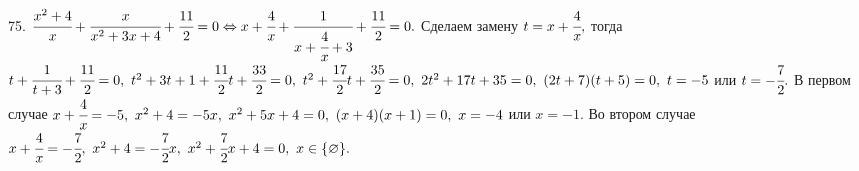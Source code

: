 75. $\cfrac{x^2+4}{x}+\cfrac{x}{x^2+3x+4}+\cfrac{11}{2}=0\Leftrightarrow x+\cfrac{4}{x}+\cfrac{1}{x+\cfrac{4}{x}+3}+\cfrac{11}{2}=0.$ Сделаем замену $t=x+\cfrac{4}{x},$ тогда $t+\cfrac{1}{t+3}+\cfrac{11}{2}=0,\ t^2+3t+1+\cfrac{11}{2}t+\cfrac{33}{2}=0,\ t^2+\cfrac{17}{2}t+\cfrac{35}{2}=0,\
2t^2+17t+35=0,\ (2t+7)(t+5)=0,\ t=-5$ или $t=-\cfrac{7}{2}.$ В первом случае $x+\cfrac{4}{x}=-5,\ x^2+4=-5x,\ x^2+5x+4=0,\ (x+4)(x+1)=0,\ x=-4$ или $x=-1.$ Во втором случае $x+\cfrac{4}{x}=-\cfrac{7}{2},\ x^2+4=-\cfrac{7}{2}x,\ x^2+\cfrac{7}{2}x+4=0,\ x\in\{\varnothing\}.$\\
